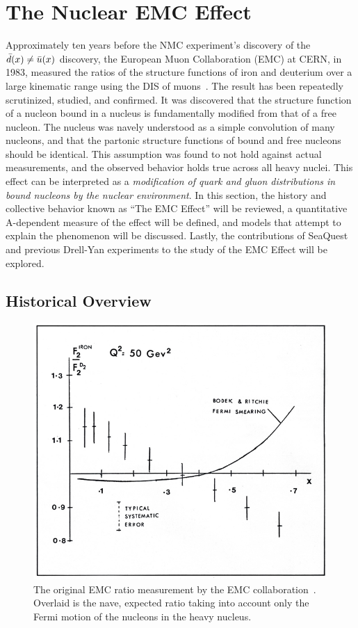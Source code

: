 \section{The Nuclear EMC Effect}

Approximately ten years before the NMC experiment's discovery of the $\bar{d}(x)\neq\bar{u}(x)$ discovery, the European Muon Collaboration (EMC) at CERN, in 1983, measured the ratios of the structure functions of iron and deuterium over a large kinematic range using the DIS of muons~\cite{Aubert:1983xm}. The result has been repeatedly scrutinized, studied, and confirmed. It was discovered that the structure function of a nucleon bound in a nucleus is fundamentally modified from that of a free nucleon. The nucleus was navely understood as a simple convolution of many nucleons, and that the partonic structure functions of bound and free nucleons should be identical. This assumption was found to not hold against actual measurements, and the observed behavior holds true across all heavy nuclei. This effect can be interpreted as a \emph{modification of quark and gluon distributions in bound nucleons by the nuclear environment}. In this section, the history and collective behavior known as ``The EMC Effect'' will be reviewed, a quantitative A-dependent measure of the effect will be defined, and models that attempt to explain the phenomenon will be discussed. Lastly, the contributions of SeaQuest and previous Drell-Yan experiments to the study of the EMC Effect will be explored.

\subsection{Historical Overview} \label{ssec:emc-history}

\begin{figure}
	\centering
	\includegraphics[height=0.35\textheight]{figures/background/emc_effect_original-v2.jpg}
	\caption{The original EMC ratio measurement by the EMC collaboration~\cite{Aubert:1983xm}. Overlaid is the nave, expected ratio taking into account only the Fermi motion of the nucleons in the heavy nucleus.}
	\label{fig:emc-one-naive}
\end{figure}

